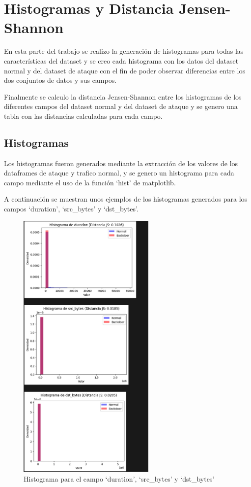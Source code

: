 \documentclass[12pt,a4paper]{article}
\begin{document}
\section{Histogramas y Distancia Jensen-Shannon}\label{sec:histogramas-y-distancia-jensen-shannon}

En esta parte del trabajo se realizo la generación de histogramas para todas las
características del dataset y se creo cada histograma con los datos del dataset normal y
del dataset de ataque con el fin de poder observar diferencias entre los dos conjuntos de datos y sus campos.

Finalmente se calculo la distancia Jensen-Shannon entre los histogramas de los diferentes campos del dataset normal y del dataset de ataque y se genero
una tabla con las distancias calculadas para cada campo.

\subsection{Histogramas}\label{subsec:histogramas}

Los histogramas fueron generados mediante la extracción de los valores de los dataframes de ataque y trafico normal,
y se genero un histograma para cada campo mediante el uso de la función `hist' de matplotlib.

A continuación se muestran unos ejemplos de los histogramas generados para los campos `duration', `src_bytes' y `dst_bytes'.

\begin{figure}[htpb]
  \centering
  \includegraphics[width=0.6\textwidth]{images/histogramas}
  \caption{Histograma para el campo `duration', `src_bytes' y `dst_bytes'}\label{fig:figure}
\end{figure}
\end{document}
